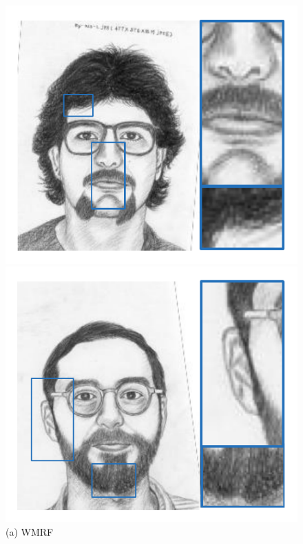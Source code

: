 \documentclass[10pt,twocolumn,letterpaper]{article}
\begin{document}
\begin{figure}[htbp]
\begin{minipage}[t]{0.138\linewidth}
\includegraphics[width=0.99\linewidth]{img/example3_gro.pdf}
\includegraphics[width=0.99\linewidth]{img/example4_gro.pdf}
(a) WMRF
\end{minipage}
\begin{minipage}[t]{0.138\linewidth}
\centering

\end{minipage}
\end{figure}
\end{document}
